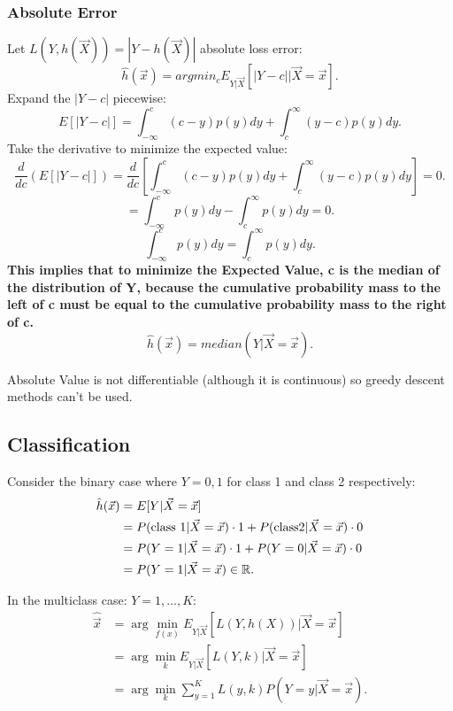\documentclass[a4paper]{article}
\begin{document}
  \subsubsection{Absolute Error}
  Let $L(Y, h(\vec{X})) = |Y - h(\vec{X})|$ absolute loss error:
  \[
    \hat{h}(\vec{x}) = argmin_c E_{Y | \vec{X}} [ | Y - c| | \vec{X} = \vec{x}] 
  .\] 
  Expand the $|Y - c|$ piecewise:
  \[
    E[|Y - c|] = \int_{-\infty}^c (c-y) p(y) dy + \int_c^{\infty} (y-c) p(y) dy
  .\] 
  Take the derivative to minimize the expected value:
  \[
    \frac{d}{dc} ( E[|Y - c|]) = \frac{d}{dc} [\int_{-\infty}^c (c-y) p(y) dy + \int_c^{\infty} (y-c) p(y) dy] = 0
  .\]
  \[
    = \int_{-\infty}^c p(y) dy - \int_c^{\infty} p(y) dy = 0 
  .\] 
  \[
  \int_{-\infty}^c p(y) dy = \int_c^{\infty} p(y) dy
  .\] 
\textbf{This implies that to minimize the Expected Value, c is the median of the distribution of Y, 
because the cumulative probability mass to the left of c must be equal to the cumulative 
probability mass to the right of c.}
\[
  \hat{h}(\vec{x}) = median(Y | \vec{X} = \vec{x})
.\] 
\begin{remark}
  Absolute Value is not differentiable (although it is continuous) so greedy descent methods can't be used.
\end{remark}

\subsection{Classification}
Consider the binary case where $Y = 0,1$ for class 1 and class 2 respectively:
\begin{align*}
  \hat{h}(\vec{x}) &= E[Y|\vec{X} = \vec{x}] \\ 
                   &= P(\text{class 1} | \vec{X} = \vec{x}) \cdot 1 + P(\text{class} 2 | \vec{X} = \vec{x}) \cdot 0 \\
                   &= P(Y = 1 | \vec{X} = \vec{x}) \cdot 1 + P(Y = 0 | \vec{X} = \vec{x}) \cdot 0 \\
                   &= P(Y = 1 | \vec{X} = \vec{x}) \in \mathbb{R}
.\end{align*}

In the multiclass case: $Y = 1, \ldots, K$:
\begin{align*}
  \hat{\vec{x}} &= \arg\min_{f(x)} E_{Y|\vec{X}} [L(Y, h(X))|\vec{X} = \vec{x}] \\
                &= \arg\min_k E_{Y | \vec{X}}[L(Y, k) | \vec{X} = \vec{x}] \\
                &= \arg\min_k \sum_{y=1}^K L(y,k) P(Y = y | \vec{X} = \vec{x}) 
.\end{align*}
\end{document}
